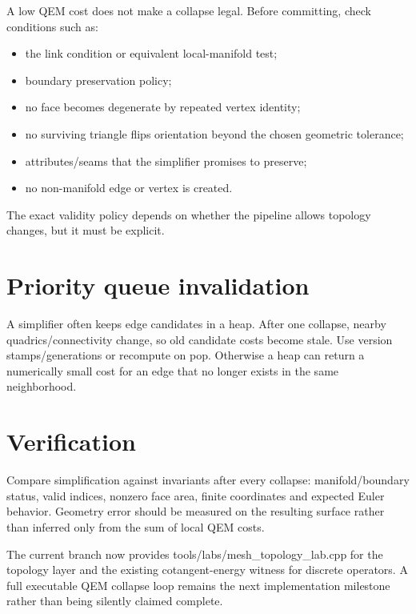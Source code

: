 A low QEM cost does not make a collapse legal. Before committing, check conditions such as:

\begin{itemize}
\tightlist
\item
  the link condition or equivalent local-manifold test;
\item
  boundary preservation policy;
\item
  no face becomes degenerate by repeated vertex identity;
\item
  no surviving triangle flips orientation beyond the chosen geometric tolerance;
\item
  attributes/seams that the simplifier promises to preserve;
\item
  no non-manifold edge or vertex is created.
\end{itemize}

The exact validity policy depends on whether the pipeline allows topology changes, but it must be explicit.

\section{Priority queue invalidation}\label{appendix-89db9fe1bc8a-priority-queue-invalidation}

A simplifier often keeps edge candidates in a heap. After one collapse, nearby quadrics/connectivity change, so old candidate costs become stale. Use version stamps/generations or recompute on pop. Otherwise a heap can return a numerically small cost for an edge that no longer exists in the same neighborhood.

\section{Verification}\label{appendix-89db9fe1bc8a-verification}

Compare simplification against invariants after every collapse: manifold/boundary status, valid indices, nonzero face area, finite coordinates and expected Euler behavior. Geometry error should be measured on the resulting surface rather than inferred only from the sum of local QEM costs.

The current branch now provides tools/labs/mesh\_topology\_lab.cpp for the topology layer and the existing cotangent-energy witness for discrete operators. A full executable QEM collapse loop remains the next implementation milestone rather than being silently claimed complete.

